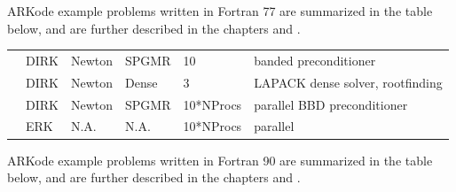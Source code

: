 \documentclass[letterpaper,10pt,english]{sphinxmanual}
\begin{document}
ARKode example problems written in Fortran 77 are summarized in the table
below, and are further described in the chapters {\hyperref[\detokenize{f77_serial:serial-f77}]{}} and
{\hyperref[\detokenize{f77_parallel:parallel-f77}]{}}.


\begin{savenotes}\sphinxattablestart
\centering
\begin{tabulary}{\linewidth}[t]{|T|T|T|T|T|T|}
\hline
{}\relax &\relax &\relax &\relax &\relax &\relax \\
\hline
{\hyperref[\detokenize{f77_serial:fark-diurnal-kry-bp}]{}}
&
DIRK
&
Newton
&
SPGMR
&
10
&
banded preconditioner
\\
\hline
{\hyperref[\detokenize{f77_serial:fark-roberts-dnsl}]{}}
&
DIRK
&
Newton
&
Dense
&
3
&
LAPACK dense solver, rootfinding
\\
\hline
{\hyperref[\detokenize{f77_parallel:fark-diag-kry-bbd-p}]{}}
&
DIRK
&
Newton
&
SPGMR
&
10*NProcs
&
parallel BBD preconditioner
\\
\hline
{\hyperref[\detokenize{f77_parallel:fark-diag-non-p}]{}}
&
ERK
&
N.A.
&
N.A.
&
10*NProcs
&
parallel
\\
\hline
\end{tabulary}
\par
\sphinxattableend\end{savenotes}

ARKode example problems written in Fortran 90 are summarized in the table
below, and are further described in the chapters {\hyperref[\detokenize{f90_serial:serial-f90}]{}} and
{\hyperref[\detokenize{f90_parallel:parallel-f90}]{}}.
\end{document}
